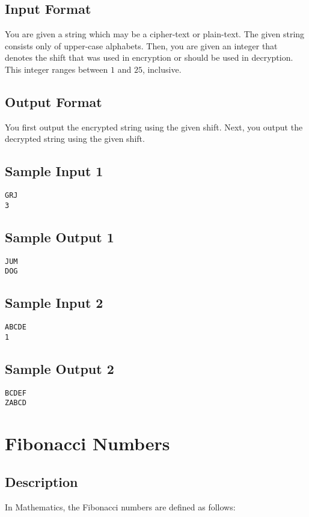 \documentclass[12pt]{article}
\begin{document}
\subsection*{Input Format}
You are given a string which may be a cipher-text or plain-text. The given string consists only of upper-case alphabets.  Then, you are given an integer that denotes the shift that was used in encryption or should be used in decryption.  This integer ranges between $1$ and $25$, inclusive. 

\subsection*{Output Format}
You first output the encrypted string using the given shift.
Next, you output the decrypted string using the given shift. 

\subsection*{Sample Input 1}
\begin{verbatim}
GRJ
3
\end{verbatim}
\subsection*{Sample Output 1}
\begin{verbatim}
JUM
DOG
\end{verbatim}

\subsection*{Sample Input 2}
\begin{verbatim}
ABCDE
1
\end{verbatim}
\subsection*{Sample Output 2}
\begin{verbatim}
BCDEF
ZABCD
\end{verbatim}


\newpage

\section{Fibonacci Numbers}
\subsection*{Description}
In Mathematics, the Fibonacci numbers are defined as follows:
\end{document}
